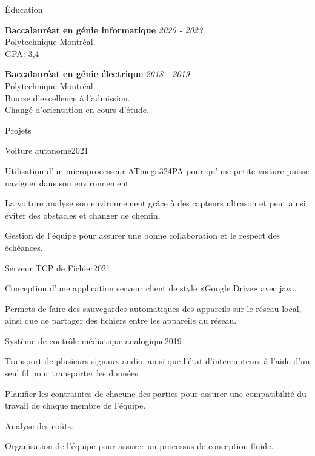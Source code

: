 \documentclass[french,12pt]{resume} %
\begin{document}
	
	
	\begin{rSection}{Éducation}
		
		{\bf Baccalauréat en génie informatique} \hfill {\em  2020 - 2023} 
		\\ Polytechnique Montréal.
		\\GPA: 3,4 
		
		
		{\bf Baccalauréat en génie électrique} \hfill {\em  2018 - 2019} 
		\\ Polytechnique Montréal.
		\\ Bourse d'excellence à l'admission.
		\\ Changé d'orientation en cours d'étude.
		
	\end{rSection}
	
	
	\begin{rSection}{Projets}

		 \begin{rSubsection}{Voiture autonome}{2021}{}{}
			\item Utilisation d'un microprocesseur ATmega324PA pour qu'une petite voiture puisse naviguer dans son environnement.
			\item La voiture analyse son environnement grâce à des capteurs ultrason et peut ainsi éviter des obstacles et changer de chemin.
			\item Gestion de l'équipe pour assurer une bonne collaboration et le respect des échéances.
			 
		 \end{rSubsection}


		\begin{rSubsection}{Serveur TCP de Fichier}{2021}{}{}
			\item Conception d'une application serveur client de style «Google Drive» avec java.
			\item Permets de faire des sauvegardes automatiques des appareils sur le réseau local, ainsi que de partager des fichiers entre les appareils du réseau.
		\end{rSubsection}
		
		\begin{rSubsection}{Système de contrôle médiatique analogique}{2019}{}{}
			\item   Transport de plusieurs signaux audio, ainsi que l'état d'interrupteurs à l'aide d'un seul fil pour transporter les données.
			\item Planifier les contraintes de chacune des parties pour assurer une compatibilité du travail de chaque membre de l'équipe.
			\item \item  Analyse des coûts.
			\item Organisation de l'équipe pour assurer un processus de conception fluide.
		\end{rSubsection}


\end{rSection}
\end{document}
